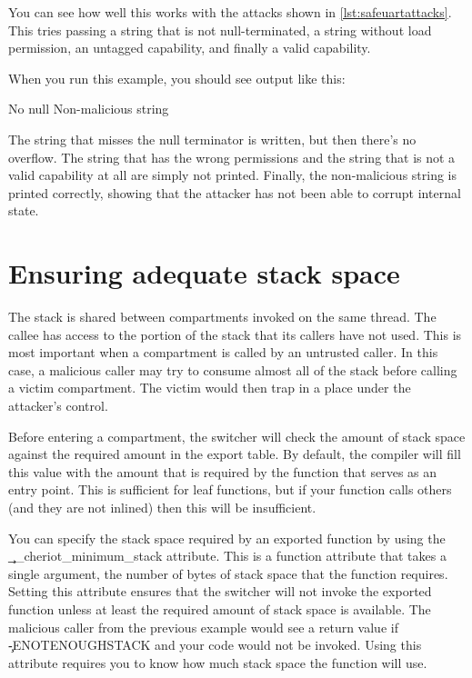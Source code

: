 You can see how well this works with the attacks shown in \ref{lst:safeuartattacks}.
This tries passing a string that is not null-terminated, a string without load permission, an untagged capability, and finally a valid capability.

\codelisting[marker=attacks,caption=Attempting to attack the safe UART.,label=lst:safeuartattacks, filename=examples/check_arguments/hello.cc]{}

When you run this example, you should see output like this:

\begin{console}
No null
Non-malicious string
\end{console}

The string that misses the null terminator is written, but then there's no overflow.
The string that has the wrong permissions and the string that is not a valid capability at all are simply not printed.
Finally, the non-malicious string is printed correctly, showing that the attacker has not been able to corrupt internal state.

\section{Ensuring adequate stack space}

The stack is shared between compartments invoked on the same thread.
The callee has access to the portion of the stack that its callers have not used.
This is most important when a compartment is called by an untrusted caller.
In this case, a malicious caller may try to consume almost all of the stack before calling a victim compartment.
The victim would then trap in a place under the attacker's control.

Before entering a compartment, the switcher will check the amount of stack space against the required amount in the export table.
By default, the compiler will fill this value with the amount that is required by the function that serves as an entry point.
This is sufficient for leaf functions, but if your function calls others (and they are not inlined) then this will be insufficient.

You can specify the stack space required by an exported function by using the \c{__cheriot_minimum_stack} attribute.
This is a function attribute that takes a single argument, the number of bytes of stack space that the function requires.
Setting this attribute ensures that the switcher will not invoke the exported function unless at least the required amount of stack space is available.
The malicious caller from the previous example would see a return value if \c{-ENOTENOUGHSTACK} and your code would not be invoked.
Using this attribute requires you to know how much stack space the function will use.

